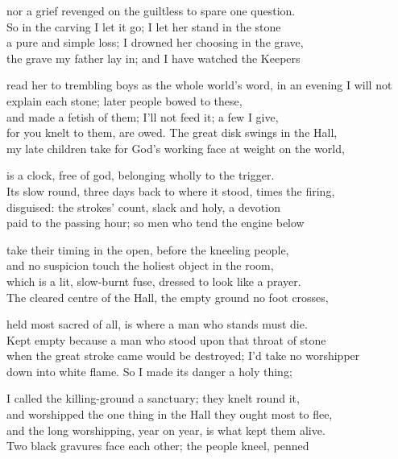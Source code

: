 \begin{founder}
nor a grief revenged on the guiltless to spare one question.\\
So in the carving I let it go; I let her stand in the stone\\
a pure and simple loss; I drowned her choosing in the grave,\\
the grave my father lay in; and I have watched the Keepers\\
\medskip

read her to trembling boys as the whole world's word, in an evening
I will not explain each stone; later people bowed to these,\\
and made a fetish of them; I'll not feed it; a few I give,\\
for you knelt to them, are owed. The great disk swings in the Hall,\\
my late children take for God's working face at weight on the world,\\
\medskip

is a clock, free of god, belonging wholly to the trigger.\\
Its slow round, three days back to where it stood, times the firing,\\
disguised: the strokes' count, slack and holy, a devotion\\
paid to the passing hour; so men who tend the engine below\\
\medskip

take their timing in the open, before the kneeling people,\\
and no suspicion touch the holiest object in the room,\\
which is a lit, slow-burnt fuse, dressed to look like a prayer.\\
The cleared centre of the Hall, the empty ground no foot crosses,\\
\medskip

held most sacred of all, is where a man who stands must die.\\
Kept empty because a man who stood upon that throat of stone\\
when the great stroke came would be destroyed; I'd take no worshipper\\
down into white flame. So I made its danger a holy thing;\\
\medskip

I called the killing-ground a sanctuary; they knelt round it,\\
and worshipped the one thing in the Hall they ought most to flee,\\
and the long worshipping, year on year, is what kept them alive.\\
Two black gravures face each other; the people kneel, penned\\
\medskip


\end{founder}
